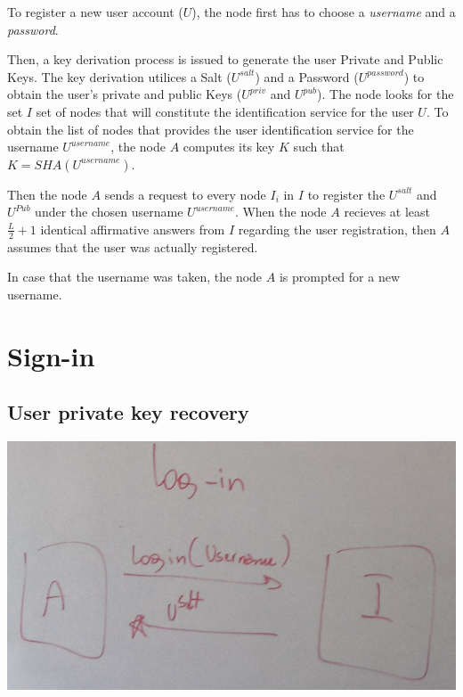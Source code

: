 To register a new user account ($U$), the node first
has to choose a \textit{username} and a \textit{password}.
% 
% 

Then, a key derivation process is issued to generate the user Private and
Public Keys. The
key derivation utilices a Salt ($U^{salt}$) and a Password ($U^{password}$) to
obtain the user's private and public Keys
($U^{priv}$ and $U^{pub}$).
The node  looks for the set $I$ set of nodes that will constitute the
identification service for the user $U$. To obtain the list of nodes that provides the user identification service for
the username $U^{username}$, the node $A$ computes its key $K$ such that $K =
SHA(U^{username})$. 

Then the node $A$ sends a request to every node $I_i$ in $I$ to register the
$U^{salt}$ and $U^{Pub}$ under the chosen  username  $U^{username}$. When the node
$A$ recieves at least $\frac{L}{2} + 1$ identical affirmative answers from
$I$ regarding the user registration, then $A$ assumes that the user was
actually registered.

In case that the username was taken,
the node $A$ is prompted for a new username.


\section{Sign-in}

\subsection{User private key recovery}
\label{sec:private_key_recovery}
\includegraphics[width=14cm]{../img/login_protocol_mockup}\\

